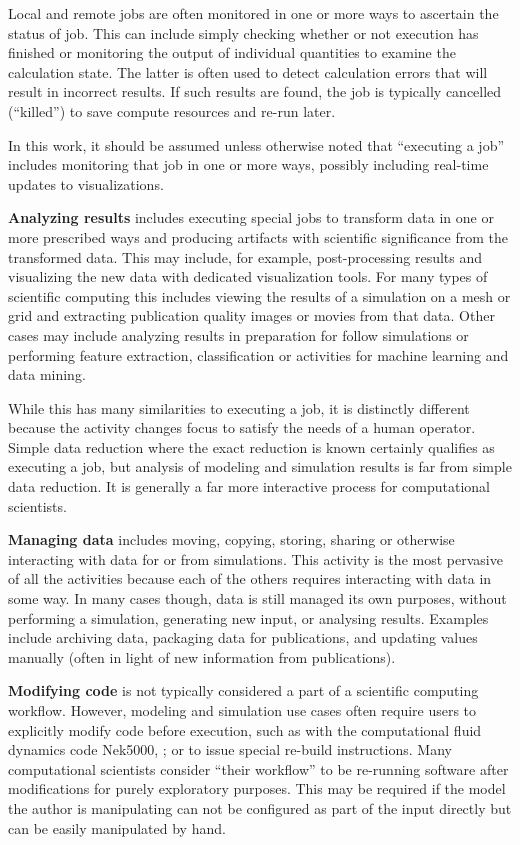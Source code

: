Local and remote jobs are often monitored in one or more ways to
ascertain the status of job. This can include simply checking whether or
not execution has finished or monitoring the output of individual
quantities to examine the calculation state. The latter is often used to
detect calculation errors that will result in incorrect results. If such
results are found, the job is typically cancelled (``killed'') to save
compute resources and re-run later.

In this work, it should be assumed unless otherwise noted that
``executing a job'' includes monitoring that job in one or more ways,
possibly including real-time updates to visualizations.

\textbf{Analyzing results} includes executing special jobs to transform
data in one or more prescribed ways and producing artifacts with
scientific significance from the transformed data. This may include, for
example, post-processing results and visualizing the new data with
dedicated visualization tools. For many types of scientific computing
this includes viewing the results of a simulation on a mesh or grid and
extracting publication quality images or movies from that data. Other
cases may include analyzing results in preparation for follow
simulations or performing feature extraction, classification or
activities for machine learning and data mining.

While this has many similarities to executing a job, it is distinctly
different because the activity changes focus to satisfy the needs of a
human operator. Simple data reduction where the exact reduction is known
certainly qualifies as executing a job, but analysis of modeling and
simulation results is far from simple data reduction. It is generally a
far more interactive process for computational scientists.

\textbf{Managing data} includes moving, copying, storing, sharing or
otherwise interacting with data for or from simulations. This activity
is the most pervasive of all the activities because each of the others
requires interacting with data in some way. In many cases though, data
is still managed its own purposes, without performing a simulation,
generating new input, or analysing results. Examples include archiving
data, packaging data for publications, and updating values manually
(often in light of new information from publications).

\textbf{Modifying code} is not typically considered a part of a
scientific computing workflow. However, modeling and simulation use
cases often require users to explicitly modify code before execution,
such as with the computational fluid dynamics code Nek5000,
\cite{the_nek5000_team_nek5000_2014}; or to issue special re-build instructions.
Many computational scientists consider ``their workflow'' to be re-running
software after modifications for purely exploratory purposes. This may
be required if the model the author is manipulating can not be
configured as part of the input directly but can be easily manipulated
by hand.

